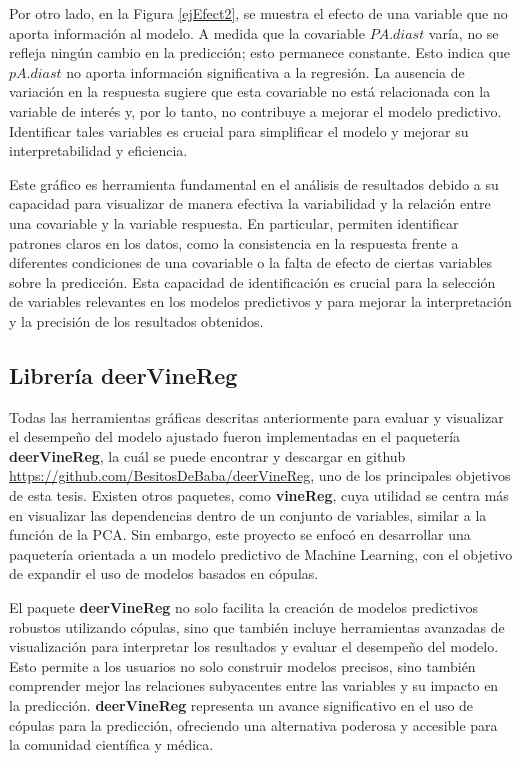 Por otro lado, en la Figura \ref{ejEfect2}, se muestra el efecto de una variable que no aporta información al modelo. A medida que la covariable $PA.diast$ varía, no se refleja ningún cambio en la predicción; esto permanece constante. Esto indica que  $pA.diast$ no aporta información significativa a la regresión. La ausencia de variación en la respuesta sugiere que esta covariable no está relacionada con la variable de interés y, por lo tanto, no contribuye a mejorar el modelo predictivo. Identificar tales variables es crucial para simplificar el modelo y mejorar su interpretabilidad y eficiencia.

Este gráfico es herramienta fundamental en el análisis de resultados debido a su capacidad para visualizar de manera efectiva la variabilidad y la relación entre una covariable y la variable respuesta. En particular, permiten identificar patrones claros en los datos, como la consistencia en la respuesta frente a diferentes condiciones de una covariable o la falta de efecto de ciertas variables sobre la predicción. Esta capacidad de identificación es crucial para la selección de variables relevantes en los modelos predictivos y para mejorar la interpretación y la precisión de los resultados obtenidos. 


\subsection{Librería deerVineReg}

Todas las herramientas gráficas descritas anteriormente para evaluar y visualizar el desempeño del modelo ajustado fueron implementadas en el paquetería \textbf{deerVineReg}, la cuál se puede encontrar y descargar en github \url{https://github.com/BesitosDeBaba/deerVineReg}, uno de los principales objetivos de esta tesis. Existen otros paquetes, como \textbf{vineReg}, cuya utilidad se centra más en visualizar las dependencias dentro de un conjunto de variables, similar a la función de la PCA. Sin embargo, este proyecto se enfocó en desarrollar una paquetería orientada a un modelo predictivo de Machine Learning, con el objetivo de expandir el uso de modelos basados en cópulas.

El paquete \textbf{deerVineReg} no solo facilita la creación de modelos predictivos robustos utilizando cópulas, sino que también incluye herramientas avanzadas de visualización para interpretar los resultados y evaluar el desempeño del modelo. Esto permite a los usuarios no solo construir modelos precisos, sino también comprender mejor las relaciones subyacentes entre las variables y su impacto en la predicción. \textbf{deerVineReg} representa un avance significativo en el uso de cópulas para la predicción, ofreciendo una alternativa poderosa y accesible para la comunidad científica y médica.